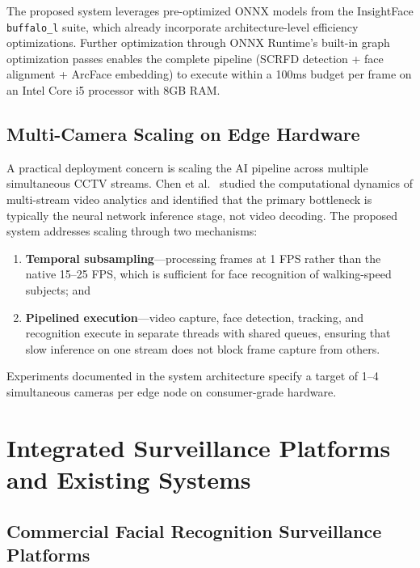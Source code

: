 \documentclass[12pt, a4paper]{article}
\begin{document}
\noindent The proposed system leverages pre-optimized ONNX models from the InsightFace \texttt{buffalo\_l} suite, which already incorporate architecture-level efficiency optimizations. Further optimization through ONNX Runtime's built-in graph optimization passes enables the complete pipeline (SCRFD detection + face alignment + ArcFace embedding) to execute within a 100ms budget per frame on an Intel Core i5 processor with 8GB RAM.

\subsection{Multi-Camera Scaling on Edge Hardware}

A practical deployment concern is scaling the AI pipeline across multiple simultaneous CCTV streams. Chen et al.\ \cite{chen2021multistream} studied the computational dynamics of multi-stream video analytics and identified that the primary bottleneck is typically the neural network inference stage, not video decoding. The proposed system addresses scaling through two mechanisms:
\begin{enumerate}[label=(\arabic*)]
    \item \textbf{Temporal subsampling}---processing frames at 1 FPS rather than the native 15--25 FPS, which is sufficient for face recognition of walking-speed subjects; and
    \item \textbf{Pipelined execution}---video capture, face detection, tracking, and recognition execute in separate threads with shared queues, ensuring that slow inference on one stream does not block frame capture from others.
\end{enumerate}

\noindent Experiments documented in the system architecture specify a target of 1--4 simultaneous cameras per edge node on consumer-grade hardware.


\section{Integrated Surveillance Platforms and Existing Systems}

\subsection{Commercial Facial Recognition Surveillance Platforms}
\end{document}
